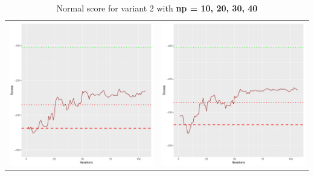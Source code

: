 \documentclass[]{scrartcl}
\begin{document}
\begin{table}[h!]
\begin{tabular}{cc}
\includegraphics[scale = 0.4]{./figs/asia/v2/30/boundsEvolution-107.pdf} & 
\includegraphics[scale = 0.4]{./figs/asia/v2/40/boundsEvolution-107.pdf} \\
\end{tabular}
\caption{Normal score for variant 2 with \textbf{np =  10, 20, 30, 40}}
\end{table}
\end{document}
